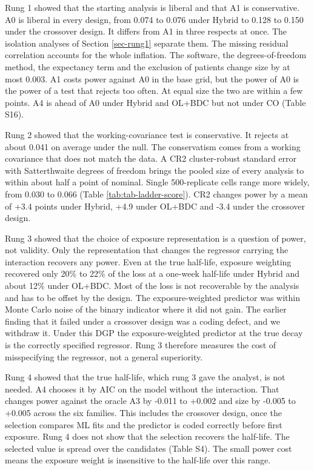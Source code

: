 \documentclass[
  11pt,
]{article}
\begin{document}
Rung 1 showed that the starting analysis is liberal and that A1 is
conservative. A0 is liberal in every design, from
0.074 to 0.076 under Hybrid to 0.128 to 0.150 under
the crossover design. It differs from A1 in three respects at once.
The isolation analyses of Section \ref{sec-rung1} separate them. The
missing residual
correlation accounts for the whole inflation. The software, the
degrees-of-freedom method, the expectancy term and the exclusion of
patients change size by at most
0.003.
A1 costs power against A0 in the base grid, but the power of A0 is
the power of a test that rejects too often. At equal size the two are
within a few points. A4 is ahead of A0 under Hybrid and OL+BDC but
not under CO (Table S16).

Rung 2 showed that the working-covariance test is conservative. It
rejects at about 0.041 on average under the
null. The conservatism comes from a working covariance that does not
match the data. A CR2 cluster-robust standard
error with Satterthwaite degrees of freedom brings the pooled size of
every analysis to within about half a point of nominal. Single
500-replicate cells range more widely, from
0.030
to 0.066
(Table \ref{tab:tab-ladder-score}). CR2 changes power by a mean
of +3.4 points under
Hybrid, +4.9 under
OL+BDC and -3.4 under the
crossover design.

Rung 3 showed that the choice of exposure representation is a question
of power, not validity. Only the representation that changes the
regressor carrying the interaction recovers any power. Even at the
true half-life, exposure weighting recovered only
20\% to 22\% of the loss at a one-week half-life under
Hybrid and about 12\% under OL+BDC. Most of the loss is
not recoverable by the analysis and has to be offset by the design. The
exposure-weighted predictor was within Monte Carlo noise of the
binary indicator where it did not gain. The earlier finding that it
failed under a crossover design was a coding defect, and we withdraw
it. Under this DGP the exposure-weighted predictor at the true decay is
the correctly specified regressor. Rung 3 therefore measures the cost
of misspecifying the regressor, not a general superiority.

Rung 4 showed that the true half-life, which rung 3 gave the analyst,
is not needed. A4 chooses it by AIC on the model without the
interaction. That changes power against the oracle A3 by
-0.011 to +0.002 and size by
-0.005 to +0.005 across the six families. This
includes the crossover design, once the selection compares ML fits and
the predictor is coded correctly before first exposure. Rung 4 does not
show that the selection recovers the half-life. The selected value is
spread over the candidates (Table S4). The small power
cost means the exposure weight is insensitive to the half-life over
this range.
\end{document}
